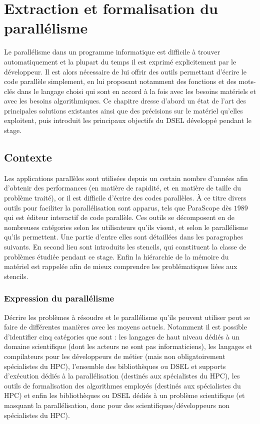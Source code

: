 
\chapter{Extraction et formalisation du parallélisme}

Le parallélisme dans un programme informatique est difficile à trouver automatiquement et la plupart du temps il est exprimé explicitement par le développeur. Il est alors nécessaire de lui offrir des outils permettant d'écrire le code parallèle simplement, en lui proposant notamment des fonctions et des mots-clés dans le langage choisi qui sont en accord à la fois avec les besoins matériels et avec les besoins algorithmiques. Ce chapitre dresse d'abord un état de l'art des principales solutions existantes ainsi que des précisions sur le matériel qu'elles exploitent, puis introduit les principaux objectifs du DSEL développé pendant le stage.

\section{Contexte}

Les applications parallèles sont utilisées depuis un certain nombre d'années afin d'obtenir des performances (en matière de rapidité, et en matière de taille du problème traité), or il est difficile d'écrire des codes parallèles. À ce titre divers outils pour faciliter la parallélisation sont apparus, tels que \textsf{ParaScope} dès $1989$ \cite{Art24} qui est éditeur interactif de code parallèle. Ces outils se décomposent en de nombreuses catégories selon les utilisateurs qu'ils visent, et selon le parallélisme qu'ils permettent. Une partie d'entre elles sont détaillées dans les paragraphes suivants. En second lieu sont introduits les stencils, qui constituent la classe de problèmes étudiée pendant ce stage. Enfin la hiérarchie de la mémoire du matériel est rappelée afin de mieux comprendre les problématiques liées aux stencils.

\subsection{Expression du parallélisme}
\label{sec:biblio}

Décrire les problèmes à résoudre et le parallélisme qu'ils peuvent utiliser peut se faire de différentes manières avec les moyens actuels. Notamment il est possible d'identifier cinq catégories que sont : les langages de haut niveau dédiés à un domaine scientifique (dont les acteurs ne sont pas informaticiens), les langages et compilateurs pour les développeurs de métier (mais non obligatoirement spécialistes du HPC), l'ensemble des bibliothèques ou DSEL et supports d'exécution dédiés à la parallélisation (destinés aux spécialistes du HPC), les outils de formalisation des algorithmes employés (destinés aux spécialistes du HPC) et enfin les bibliothèques ou DSEL dédiés à un problème scientifique (et masquant la parallélisation, donc pour des scientifiques/développeurs non spécialistes du HPC).


